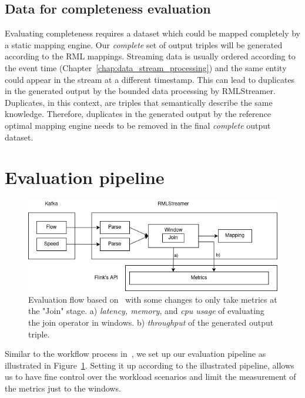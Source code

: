 \subsection{Data for completeness evaluation}
Evaluating completeness requires a dataset which could be mapped completely by a static 
mapping engine. 
Our \emph{complete} set of output triples will be generated according 
to the RML mappings. Streaming data is usually 
ordered according to the event time (Chapter~\ref{chap:data_stream_processing}) 
and the same entity could appear in the 
stream at a different timestamp. This can lead to duplicates in the generated output by 
the bounded data processing by RMLStreamer. Duplicates, in this context, are triples that semantically describe the 
same knowledge. Therefore, duplicates in the generated output by the reference optimal
mapping engine needs to be removed in the final \emph{complete} output dataset.

\section{Evaluation pipeline}

\begin{figure}[!htbp]
    \centering
    \includegraphics[width=\textwidth]{fig/evaluation_architecture.png}
    \caption{Evaluation flow based on~\cite{evalution_of_spe} with some changes to only 
    take metrics at the "Join" stage.
    a) \emph{latency, memory}, and \emph{cpu usage} of evaluating the join operator in windows.
    b) \emph{throughput} of the generated output triple.}
    \label{fig:evaluation_flow}
    
\end{figure}

Similar to the workflow process in~\cite{evalution_of_spe, benchmark_sce}, we set up
our evaluation pipeline as illustrated in Figure~\ref{fig:evaluation_flow}. Setting it 
up according to the illustrated pipeline, allows us to have fine control over the 
workload scenarios and limit the measurement of the metrics just to the windows. 




